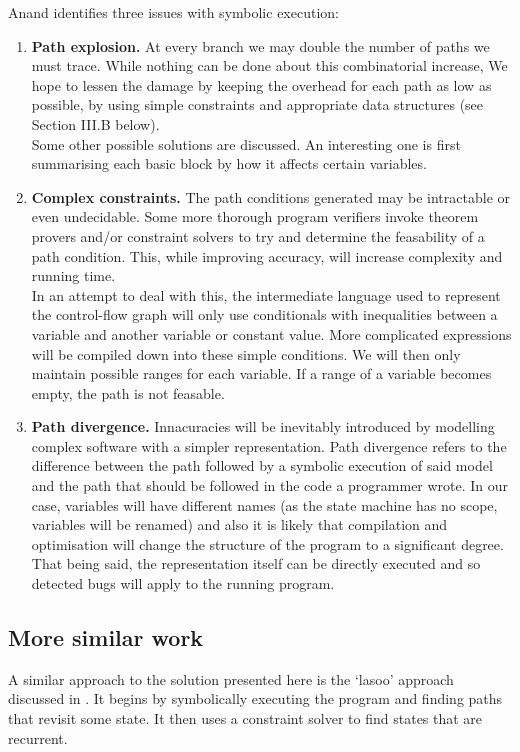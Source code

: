 \documentclass[12pt,a4paper]{article}
\begin{document}
\noindent
Anand \cite[pp.~2--3]{anand} identifies three issues with symbolic execution:\\
\begin{enumerate}
\item \textbf{Path explosion.} At every branch we may double the number of paths we must trace. While
nothing can be done about this combinatorial increase, We hope to lessen the damage by keeping the overhead
for each path as low as possible, by using simple constraints and appropriate data structures (see Section III.B below).\\ %
Some other possible solutions are discussed. An interesting one is first summarising each basic block by how it affects certain variables.\\

\item \textbf{Complex constraints.} The path conditions generated may be intractable or even undecidable. Some more thorough program verifiers \citep{zhang, gupta}
invoke theorem provers and/or constraint solvers to try and determine the feasability of a path condition. This, while improving accuracy, will increase complexity
and running time.\\
In an attempt to deal with this, the intermediate language used to represent the control-flow graph will only
use conditionals with inequalities between a variable and another variable or constant value. More complicated expressions
will be compiled down into these simple conditions. We will then only maintain possible ranges for each variable. If a range of
a variable becomes empty, the path is not feasable.\\

\item \textbf{Path divergence.} Innacuracies will be inevitably introduced by modelling complex software with a simpler representation. Path divergence refers to the difference between the path followed by a symbolic execution of said model and the path that
should be followed in the code a programmer wrote. In our case, variables will have different names (as the state machine has no scope, variables will be renamed) and also it is
likely that compilation and optimisation will change the structure of the program to a significant degree. That being said, the representation
itself can be directly executed and so detected bugs will apply to the running program.
\end{enumerate}

\subsection{More similar work}
A similar approach to the solution presented here is the `lasoo' approach discussed in \citep{gupta}. It begins by symbolically executing the program and finding paths that revisit some state. It then uses a constraint solver to find states that are recurrent.
\end{document}

